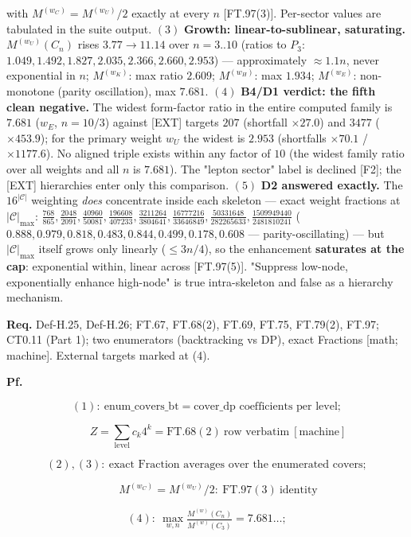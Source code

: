 \begin{theorem}
with $M^{(w_C)}=M^{(w_U)}/2$ exactly at every $n$ [FT.97(3)]. Per-sector values are tabulated in the suite output. $(3)$ \textbf{Growth: linear-to-sublinear, saturating.} $M^{(w_U)}(C_n)$ rises $3.77\to11.14$ over $n=3..10$ (ratios to $P_3$: $1.049,1.492,1.827,2.035,2.366,2.660,2.953$) — approximately $\approx1.1n$, never exponential in $n$; $M^{(w_K)}$: max ratio $2.609$; $M^{(w_H)}$: max $1.934$; $M^{(w_E)}$: non-monotone (parity oscillation), max $7.681$. $(4)$ \textbf{B4/D1 verdict: the fifth clean negative.} The widest form-factor ratio in the entire computed family is $7.681$ ($w_E$, $n{=}10/3$) against [EXT] targets $207$ (shortfall $\times27.0$) and $3477$ ($\times453.9$); for the primary weight $w_U$ the widest is $2.953$ (shortfalls $\times70.1$ / $\times1177.6$). No aligned triple exists within any factor of $10$ (the widest family ratio over all weights and all $n$ is $7.681$). The "lepton sector" label is declined [F2]; the [EXT] hierarchies enter only this comparison. $(5)$ \textbf{D2 answered exactly.} The $16^{|\mathcal C|}$ weighting \textit{does} concentrate inside each skeleton — exact weight fractions at $|\mathcal C|_{\max}$: $\tfrac{768}{865},\tfrac{2048}{2091},\tfrac{40960}{50081},\tfrac{196608}{407233},\tfrac{3211264}{3804641},\tfrac{16777216}{33646849},\tfrac{50331648}{282265633},\tfrac{1509949440}{2481810241}$ ($0.888,0.979,0.818,0.483,0.844,0.499,0.178,0.608$ — parity-oscillating) — but $|\mathcal C|_{\max}$ itself grows only linearly ($\le3n/4$), so the enhancement \textbf{saturates at the cap}: exponential within, linear across [FT.97(5)]. "Suppress low-node, exponentially enhance high-node" is true intra-skeleton and false as a hierarchy mechanism.

\textbf{Req.} Def-H.25, Def-H.26; FT.67, FT.68(2), FT.69, FT.75, FT.79(2), FT.97; CT0.11 (Part 1); two enumerators (backtracking vs DP), exact Fractions [math; machine]. External targets marked at (4).

\textbf{Pf.}

\[
(1):\ \text{enum\_covers\_bt}=\text{cover\_dp coefficients per level};
\]

\[
\qquad Z=\sum_{\text{level}}c_k4^k=\mathrm{FT.68}(2)\ \text{row verbatim}\ [\text{machine}]
\]

\[
(2),(3):\ \text{exact Fraction averages over the enumerated covers};
\]

\[
\qquad M^{(w_C)}=M^{(w_U)}/2:\ \mathrm{FT.97}(3)\ \text{identity}
\]

\[
(4):\ \max_{w,n}\tfrac{M^{(w)}(C_n)}{M^{(w)}(C_3)}=7.681\ldots;
\]


\end{theorem}
